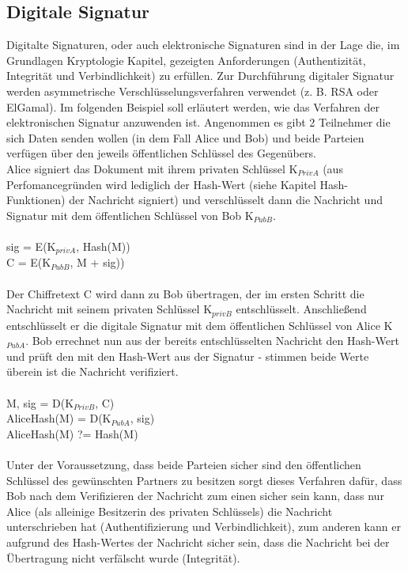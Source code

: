 \documentclass[10pt, a4paper,headsepline]{scrreprt}
\begin{document}
\subsection{Digitale Signatur}
Digitalte Signaturen, oder auch elektronische Signaturen sind in der Lage die, im Grundlagen Kryptologie Kapitel, gezeigten Anforderungen (Authentizität, Integrität und Verbindlichkeit) zu erfüllen. Zur Durchführung digitaler Signatur werden asymmetrische Verschlüsselungsverfahren verwendet (z. B. RSA oder ElGamal). Im folgenden Beispiel soll erläutert werden, wie das Verfahren der elektronischen Signatur anzuwenden ist. Angenommen es gibt 2 Teilnehmer die sich Daten senden wollen (in dem Fall Alice und Bob) und beide Parteien verfügen über den jeweils öffentlichen Schlüssel des Gegenübers. \\
Alice signiert das Dokument mit ihrem privaten Schlüssel K$_{PrivA}$ (aus Perfomancegründen wird lediglich der Hash-Wert (siehe Kapitel Hash-Funktionen) der Nachricht signiert) und verschlüsselt dann die Nachricht und Signatur mit dem öffentlichen Schlüssel von Bob K$_{PubB}$. \\ \\
sig =  E(K$_{privA}$, Hash(M)) \\
C = E(K$_{PubB}$, M + sig)) \\ \\
Der Chiffretext C wird dann zu Bob übertragen, der im ersten Schritt die Nachricht mit seinem privaten Schlüssel K$_{privB}$ entschlüsselt. Anschließend entschlüsselt er die digitale Signatur mit dem öffentlichen Schlüssel von Alice K$_{PubA}$. Bob errechnet nun aus der bereits entschlüsselten Nachricht den Hash-Wert und prüft den mit den Hash-Wert aus der Signatur - stimmen beide Werte überein ist die Nachricht verifiziert. \\ \\
M, sig = D(K$_{PrivB}$, C) \\
AliceHash(M) = D(K$_{PubA}$, sig) \\
AliceHash(M) ?= Hash(M) \\ \\
Unter der Voraussetzung, dass beide Parteien sicher sind den öffentlichen Schlüssel des gewünschten Partners zu besitzen sorgt dieses Verfahren dafür, dass Bob nach dem Verifizieren der Nachricht zum einen sicher sein kann, dass nur Alice (als alleinige Besitzerin des privaten Schlüssels) die Nachricht unterschrieben hat (Authentifizierung und Verbindlichkeit), zum anderen kann er aufgrund des Hash-Wertes der Nachricht sicher sein, dass die Nachricht bei der Übertragung nicht verfälscht wurde (Integrität).
\end{document}
